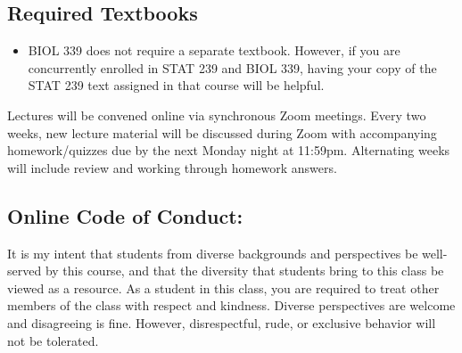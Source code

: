 \documentclass{tufte-handout}
\begin{document}
\begin{fullwidth}

\subsection{Required Textbooks}

\begin{itemize}
	\item BIOL 339 does not require a separate textbook. However, if you are concurrently enrolled in STAT 239 and BIOL 339, having your copy of the STAT 239 text assigned in that course will be helpful.
\end{itemize}




 Lectures will be convened online via synchronous Zoom meetings. Every two weeks, new lecture material will be discussed during Zoom with accompanying homework/quizzes due by the next Monday night at 11:59pm. Alternating weeks will include review and working through homework answers. 





\subsection{Online Code of Conduct: } 

It is my intent that students from diverse backgrounds and perspectives be well-served by this course, and that the diversity that students bring to this class be viewed as a resource. As a student in this class, you are required to treat other members of the class with respect and kindness. Diverse perspectives are welcome and disagreeing is fine. However, disrespectful, rude, or exclusive behavior will not be tolerated. 


\end{fullwidth}
\end{document}
